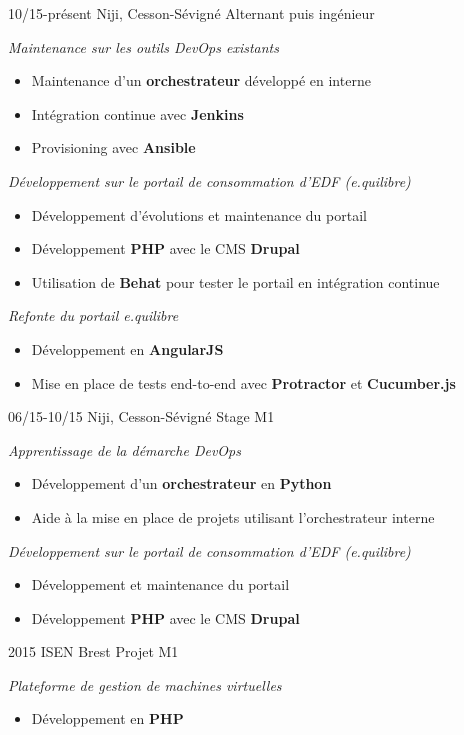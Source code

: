 \documentclass[]{friggeri-cv}
\begin{document}
\begin{entrylist}
  \entry
    {10/15-présent}
    { Niji, Cesson-Sévigné}
    {Alternant puis ingénieur}
    {\emph{Maintenance sur les outils DevOps existants}
    \begin{itemize}
      \item Maintenance d'un \textbf{orchestrateur} développé en interne
      \item Intégration continue avec \textbf{Jenkins}
      \item Provisioning avec \textbf{Ansible}
    \end{itemize}
    \emph{Développement sur le portail de consommation d'EDF (e.quilibre)}
    \begin{itemize}
      \item Développement d'évolutions et maintenance du portail
      \item Développement \textbf{PHP} avec le CMS \textbf{Drupal}
      \item Utilisation de \textbf{Behat} pour tester le portail en intégration continue
    \end{itemize}
    \emph{Refonte du portail e.quilibre}
    \begin{itemize}
      \item Développement en \textbf{AngularJS}
      \item Mise en place de tests end-to-end avec \textbf{Protractor} et \textbf{Cucumber.js}
    \end{itemize}}
  \entry
    {06/15-10/15}
    {Niji, Cesson-Sévigné}
    {Stage M1}
    {\emph{Apprentissage de la démarche DevOps}
    \begin{itemize}
      \item Développement d'un \textbf{orchestrateur} en \textbf{Python}
      \item Aide à la mise en place de projets utilisant l'orchestrateur interne
    \end{itemize}
    \emph{Développement sur le portail de consommation d'EDF (e.quilibre)}
    \begin{itemize}
      \item Développement et maintenance du portail
      \item Développement \textbf{PHP} avec le CMS \textbf{Drupal}
    \end{itemize}}
  \entry
    {2015}
    {ISEN Brest}
    {Projet M1}
    {\emph{Plateforme de gestion de machines virtuelles}
    \begin{itemize}
      \item Développement en \textbf{PHP}

\end{itemize}}
\end{entrylist}
\end{document}
